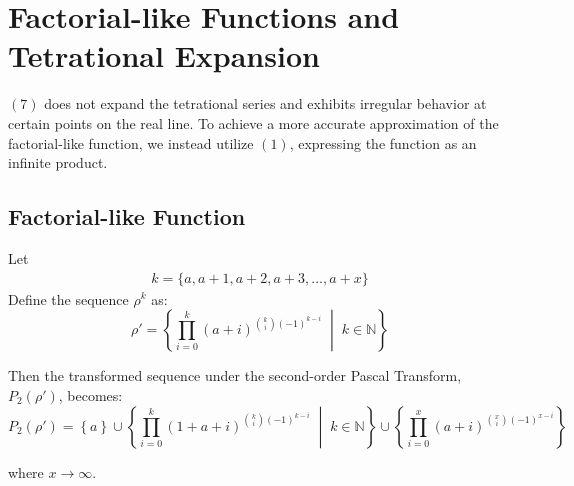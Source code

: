\section{Factorial-like Functions and Tetrational Expansion}

$(7)$ does not expand the tetrational series and exhibits irregular behavior at certain points on the real line. To achieve a more accurate approximation of the factorial-like function, we instead utilize $(1)$, expressing the function as an infinite product.

\subsection{Factorial-like Function}

Let
\begin{align}
k = \{ a, a+1, a+2, a+3, \dots, a+x \}
\end{align}
Define the sequence $\rho^k$ as:
\[
\rho' = \left\{ 
\prod_{i=0}^{k} (a+i)^{\binom{k}{i} (-1)^{k-i}} \;\middle|\; k \in \mathbb{N}
\right\}
\]

Then the transformed sequence under the second-order Pascal Transform, $P_2(\rho')$, becomes:
\[
P_2(\rho') = 
\left\{ a \right\} 
\cup 
\left\{ 
\prod_{i=0}^{k} (1+a+i)^{\binom{k}{i} (-1)^{k-i}} \;\middle|\; k \in \mathbb{N} 
\right\}
\cup 
\left\{ 
\prod_{i=0}^{x} (a+i)^{\binom{x}{i} (-1)^{x-i}} 
\right\}
\]

where $x \to \infty$.
